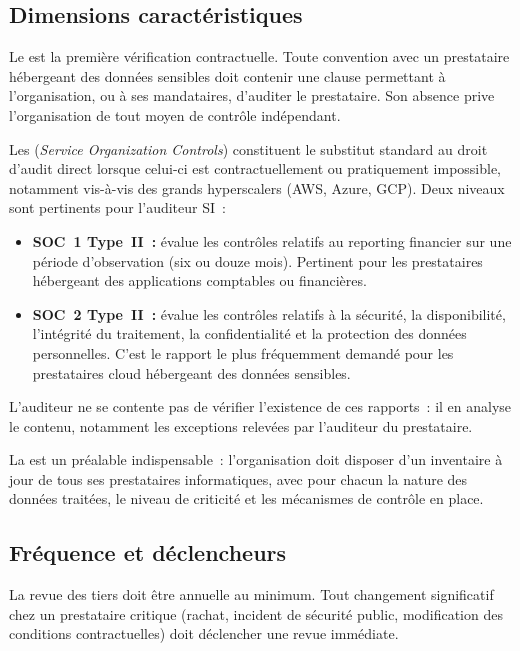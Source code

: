 \subsection{Dimensions caractéristiques}

Le  est la première vérification contractuelle. Toute
convention avec un prestataire hébergeant des données sensibles doit contenir une
clause permettant à l'organisation, ou à ses mandataires, d'auditer le prestataire.
Son absence prive l'organisation de tout moyen de contrôle indépendant.

Les  (\textit{Service Organization Controls}) constituent le
substitut standard au droit d'audit direct lorsque celui-ci est contractuellement ou
pratiquement impossible, notamment vis-à-vis des grands hyperscalers (AWS, Azure,
GCP). Deux niveaux sont pertinents pour l'auditeur SI~:
\begin{itemize}
    \item \textbf{SOC~1 Type~II~:} évalue les contrôles relatifs au reporting
        financier sur une période d'observation (six ou douze mois). Pertinent pour
        les prestataires hébergeant des applications comptables ou financières.
    \item \textbf{SOC~2 Type~II~:} évalue les contrôles relatifs à la sécurité,
        la disponibilité, l'intégrité du traitement, la confidentialité et la
        protection des données personnelles. C'est le rapport le plus fréquemment
        demandé pour les prestataires cloud hébergeant des données sensibles.
\end{itemize}

L'auditeur ne se contente pas de vérifier l'existence de ces rapports~: il en analyse
le contenu, notamment les exceptions relevées par l'auditeur du prestataire.

La  est un préalable indispensable~: l'organisation
doit disposer d'un inventaire à jour de tous ses prestataires informatiques, avec pour
chacun la nature des données traitées, le niveau de criticité et les mécanismes de
contrôle en place.

\subsection{Fréquence et déclencheurs}

La revue des tiers doit être annuelle au minimum. Tout changement significatif chez
un prestataire critique (rachat, incident de sécurité public, modification des
conditions contractuelles) doit déclencher une revue immédiate.


